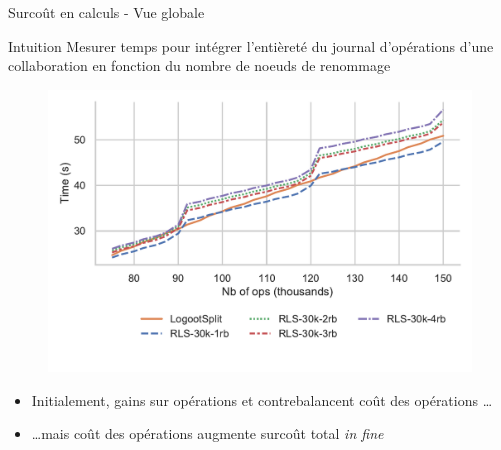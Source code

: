 \begin{frame}{Surcoût en calculs - Vue globale}
    \begin{block}{Intuition}
        Mesurer temps pour intégrer l'entièreté du journal d'opérations d'une collaboration en fonction du \alert{nombre de noeuds de renommage}
    \end{block}
    \pause
    \vspace{-0.5cm}
    \begin{figure}[!ht]
        \includegraphics[width=0.7 \columnwidth]{img/replay-log-30k-2022-12-09}
      \end{figure}
    \vspace{-1cm}
    \pause
    \begin{itemize}
        \item Initialement, gains sur opérations \ins et \rmv contrebalancent coût des opérations \ren \dots
        \item \dots mais coût des opérations \ren augmente surcoût total \emph{in fine}
    \end{itemize}
\end{frame}
